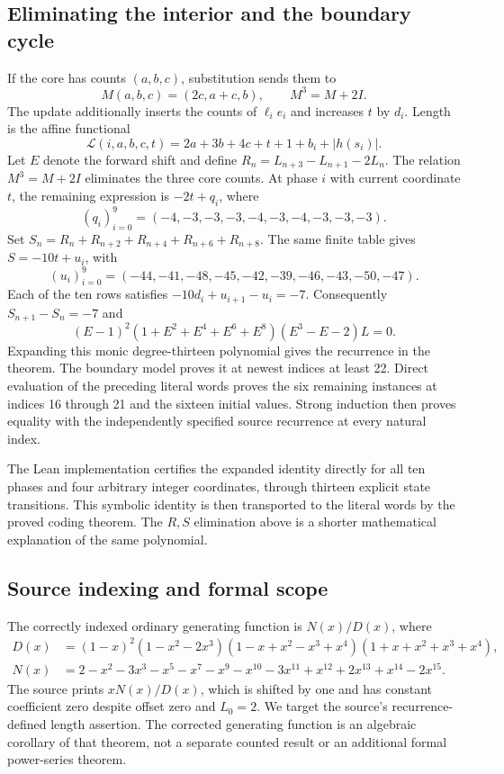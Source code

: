 \documentclass[11pt]{article}
\begin{document}
\subsection{Eliminating the interior and the boundary cycle}
If the core has counts $(a,b,c)$, substitution sends them to
\[
M(a,b,c)=(2c,a+c,b),\qquad M^3=M+2I.
\]
The update additionally inserts the counts of $\ell_i e_i$ and increases
$t$ by $d_i$. Length is the affine functional
\[
\mathcal L(i,a,b,c,t)=2a+3b+4c+t+1+b_i+|h(s_i)|.
\]
Let $E$ denote the forward shift and define
$R_n=L_{n+3}-L_{n+1}-2L_n$. The relation $M^3=M+2I$ eliminates
the three core counts. At phase $i$ with current coordinate $t$, the
remaining expression is $-2t+q_i$, where
\[
(q_i)_{i=0}^9=(-4,-3,-3,-3,-4,-3,-4,-3,-3,-3).
\]
Set $S_n=R_n+R_{n+2}+R_{n+4}+R_{n+6}+R_{n+8}$. The same finite table
gives $S=-10t+u_i$, with
\[
(u_i)_{i=0}^9=(-44,-41,-48,-45,-42,-39,-46,-43,-50,-47).
\]
Each of the ten rows satisfies $-10d_i+u_{i+1}-u_i=-7$.
Consequently $S_{n+1}-S_n=-7$ and
\begin{equation}
(E-1)^2(1+E^2+E^4+E^6+E^8)(E^3-E-2)L=0.
\label{eq:a288511:annihilator}
\end{equation}
Expanding this monic degree-thirteen polynomial gives the recurrence in
the theorem. The boundary model proves it at newest indices at least
22. Direct evaluation of the preceding literal words proves the six
remaining instances at indices 16 through 21 and the sixteen initial
values. Strong induction then proves equality with the independently
specified source recurrence at every natural index.

The Lean implementation certifies the expanded identity directly for
all ten phases and four arbitrary integer coordinates, through thirteen
explicit state transitions. This symbolic identity is then transported
to the literal words by the proved coding theorem. The $R,S$ elimination
above is a shorter mathematical explanation of the same polynomial.

\subsection{Source indexing and formal scope}
The correctly indexed ordinary generating function is $N(x)/D(x)$, where
\begin{align*}
D(x)&=(1-x)^2(1-x^2-2x^3)(1-x+x^2-x^3+x^4)(1+x+x^2+x^3+x^4),\\
N(x)&=2-x^2-3x^3-x^5-x^7-x^9-x^{10}-3x^{11}+x^{12}+2x^{13}+x^{14}-2x^{15}.
\end{align*}
The source prints $xN(x)/D(x)$, which is shifted by one and has constant
coefficient zero despite offset zero and $L_0=2$. We target the source's
recurrence-defined length assertion. The corrected generating function
is an algebraic corollary of that theorem, not a separate counted result
or an additional formal power-series theorem.
\end{document}
